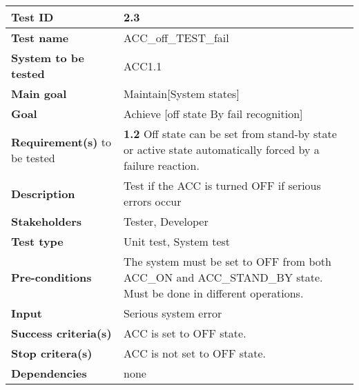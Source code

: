 	\begin{table}[H]
		\begin{tabular}{| p{4cm} | p{10cm} |}
			\hline
			\rowcolor{gray}
			{\bf Test ID} & 2.3 \\ \hline
			{\bf Test name} & ACC\_off\_TEST\_fail\\ \hline
			{\bf System to be tested} & ACC1.1\\ \hline
			{\bf Main goal} & Maintain[System states]\\ \hline
			{\bf Goal} & Achieve [off state By fail recognition]\\ \hline
			{\bf Requirement(s)} to be tested & {\bf 1.2} Off state can be set 
			from stand-by state or active state automatically forced by a failure 
			reaction. \\ \hline
			{\bf Description} & Test if the ACC is turned OFF if serious errors occur 
			\\ \hline
			{\bf Stakeholders} & Tester, Developer \\ \hline
			{\bf Test type} &  Unit test, System test \\ \hline
			{\bf Pre-conditions} & The system must be set to OFF from both 
			ACC\_ON and ACC\_STAND\_BY state. Must be done in different operations.\\ \hline
			{\bf Input} & Serious system error \\ \hline
			{\bf Success criteria(s)} & ACC is set to OFF state.\\ \hline
			{\bf Stop critera(s)} & ACC is not set to OFF state.\\ \hline
			{\bf Dependencies} & none \\ \hline
		\end{tabular}
	\end{table}

